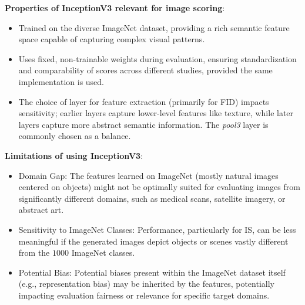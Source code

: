 \noindent\textbf{Properties of InceptionV3 relevant for image scoring}:
\begin{itemize}
    \item Trained on the diverse ImageNet dataset, providing a rich semantic feature space capable of capturing complex visual patterns.
    \item Uses fixed, non-trainable weights during evaluation, ensuring standardization and comparability of scores across different studies, provided the same implementation is used.
    \item The choice of layer for feature extraction (primarily for FID) impacts sensitivity; earlier layers capture lower-level features like texture, while later layers capture more abstract semantic information. The \textit{pool3} layer is commonly chosen as a balance.
\end{itemize}

\noindent\textbf{Limitations of using InceptionV3}:\label{theoretical_inception_model_limitaitions}
\begin{itemize}
    \item Domain Gap: The features learned on ImageNet (mostly natural images centered on objects) might not be optimally suited for evaluating images from significantly different domains, such as medical scans, satellite imagery, or abstract art.
    \item Sensitivity to ImageNet Classes: Performance, particularly for IS, can be less meaningful if the generated images depict objects or scenes vastly different from the $1 000$ ImageNet classes.
    \item Potential Bias: Potential biases present within the ImageNet dataset itself (e.g., representation bias) may be inherited by the features, potentially impacting evaluation fairness or relevance for specific target domains.
\end{itemize}



\newpage
